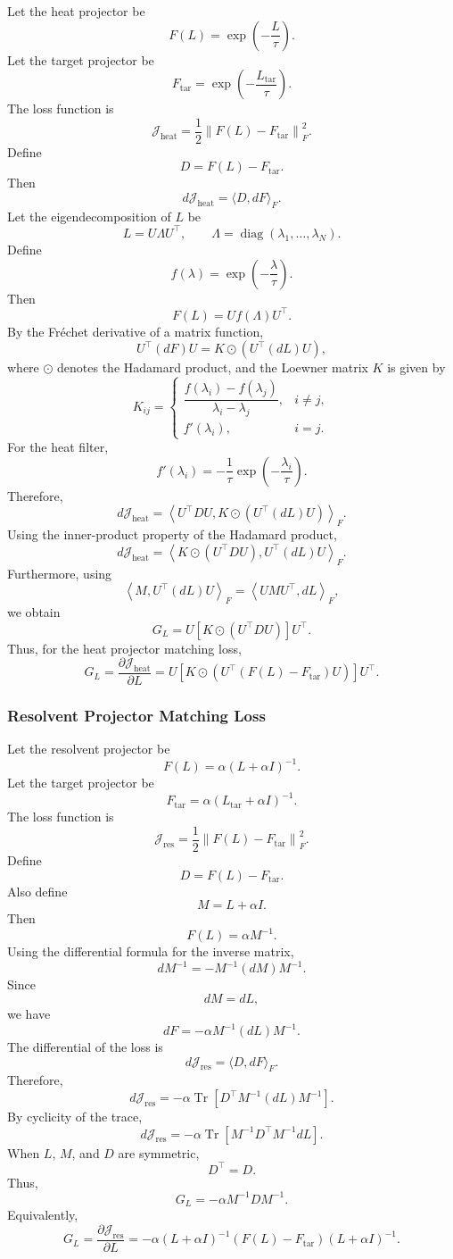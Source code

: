 \documentclass[pdflatex,sn-mathphys-ay]{sn-jnl}%
\theoremstyle{thmstyleone}%
\theoremstyle{thmstyletwo}%
\theoremstyle{thmstylethree}%
\begin{document}
\begin{appendices}
Let the heat projector be
\[
F(L)
=
\exp\left(-\frac{L}{\tau}\right).
\]
Let the target projector be
\[
F_{\mathrm{tar}}
=
\exp\left(-\frac{L_{\mathrm{tar}}}{\tau}\right).
\]
The loss function is
\[
\mathcal{J}_{\mathrm{heat}}
=
\frac{1}{2}
\left\|
F(L)-F_{\mathrm{tar}}
\right\|_F^2.
\]
Define
\[
D
=
F(L)-F_{\mathrm{tar}}.
\]
Then
\[
d\mathcal{J}_{\mathrm{heat}}
=
\langle D,dF\rangle_F.
\]
Let the eigendecomposition of \(L\) be
\[
L
=
U\Lambda U^\top,
\qquad
\Lambda
=
\operatorname{diag}(\lambda_1,\ldots,\lambda_N).
\]
Define
\[
f(\lambda)
=
\exp\left(-\frac{\lambda}{\tau}\right).
\]
Then
\[
F(L)
=
Uf(\Lambda)U^\top.
\]
By the Fréchet derivative of a matrix function,
\[
U^\top(dF)U
=
K
\odot
\left(
U^\top(dL)U
\right),
\]
where \(\odot\) denotes the Hadamard product, and the Loewner matrix \(K\) is given by
\[
K_{ij}
=
\begin{cases}
\dfrac{f(\lambda_i)-f(\lambda_j)}{\lambda_i-\lambda_j},
& i\ne j,\\[3mm]
f'(\lambda_i),
& i=j.
\end{cases}
\]
For the heat filter,
\[
f'(\lambda_i)
=
-\frac{1}{\tau}
\exp\left(-\frac{\lambda_i}{\tau}\right).
\]
Therefore,
\[
d\mathcal{J}_{\mathrm{heat}}
=
\left\langle
U^\top D U,
K\odot
\left(
U^\top(dL)U
\right)
\right\rangle_F.
\]
Using the inner-product property of the Hadamard product,
\[
d\mathcal{J}_{\mathrm{heat}}
=
\left\langle
K\odot
\left(
U^\top D U
\right),
U^\top(dL)U
\right\rangle_F.
\]
Furthermore, using
\[
\left\langle
M,
U^\top(dL)U
\right\rangle_F
=
\left\langle
UMU^\top,
dL
\right\rangle_F,
\]
we obtain
\[
G_L
=
U
\left[
K\odot
\left(
U^\top D U
\right)
\right]
U^\top.
\]
Thus, for the heat projector matching loss,
\[
G_L
=
\frac{\partial\mathcal{J}_{\mathrm{heat}}}{\partial L}
=
U
\left[
K\odot
\left(
U^\top
\left(
F(L)-F_{\mathrm{tar}}
\right)
U
\right)
\right]
U^\top.
\]

\subsubsection{Resolvent Projector Matching Loss}

Let the resolvent projector be
\[
F(L)
=
\alpha(L+\alpha I)^{-1}.
\]
Let the target projector be
\[
F_{\mathrm{tar}}
=
\alpha(L_{\mathrm{tar}}+\alpha I)^{-1}.
\]
The loss function is
\[
\mathcal{J}_{\mathrm{res}}
=
\frac{1}{2}
\left\|
F(L)-F_{\mathrm{tar}}
\right\|_F^2.
\]
Define
\[
D
=
F(L)-F_{\mathrm{tar}}.
\]
Also define
\[
M
=
L+\alpha I.
\]
Then
\[
F(L)
=
\alpha M^{-1}.
\]
Using the differential formula for the inverse matrix,
\[
dM^{-1}
=
-M^{-1}(dM)M^{-1}.
\]
Since
\[
dM=dL,
\]
we have
\[
dF
=
-\alpha M^{-1}(dL)M^{-1}.
\]
The differential of the loss is
\[
d\mathcal{J}_{\mathrm{res}}
=
\langle D,dF\rangle_F.
\]
Therefore,
\[
d\mathcal{J}_{\mathrm{res}}
=
-\alpha
\operatorname{Tr}
\left[
D^\top
M^{-1}(dL)M^{-1}
\right].
\]
By cyclicity of the trace,
\[
d\mathcal{J}_{\mathrm{res}}
=
-\alpha
\operatorname{Tr}
\left[
M^{-1}D^\top M^{-1}
dL
\right].
\]
When \(L\), \(M\), and \(D\) are symmetric,
\[
D^\top=D.
\]
Thus,
\[
G_L
=
-\alpha
M^{-1}DM^{-1}.
\]
Equivalently,
\[
G_L
=
\frac{\partial\mathcal{J}_{\mathrm{res}}}{\partial L}
=
-\alpha
(L+\alpha I)^{-1}
\left(
F(L)-F_{\mathrm{tar}}
\right)
(L+\alpha I)^{-1}.
\]


\end{appendices}
\end{document}
